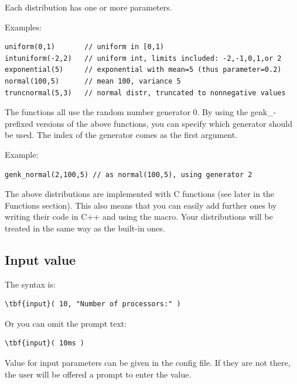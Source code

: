 Each distribution has one or more parameters.

Examples:

\begin{Verbatim}
uniform(0,1)       // uniform in [0,1)
intuniform(-2,2)   // uniform int, limits included: -2,-1,0,1,or 2
exponential(5)     // exponential with mean=5 (thus parameter=0.2)
normal(100,5)      // mean 100, variance 5
truncnormal(5,3)   // normal distr, truncated to nonnegative values
\end{Verbatim}

The functions all use the random number generator 0. By using the
genk\_-prefixed versions of the
above functions, you can specify which generator should be used. The
index of the generator comes as the first argument.


Example:

\begin{Verbatim}
genk_normal(2,100,5) // as normal(100,5), using generator 2
\end{Verbatim}


The above distributions are implemented with C functions (see later in
the Functions section). This also means that you can easily add
further ones by writing their code in C++ and using the
 macro. Your distributions will be treated
in the same way as the built-in ones.





\subsection{Input value}

The syntax is:


\begin{Verbatim}[commandchars=\\\{\}]
    \tbf{input}( 10, "Number of processors:" )
\end{Verbatim}


Or you can omit the prompt text:

\begin{Verbatim}[commandchars=\\\{\}]
    \tbf{input}( 10ms )
\end{Verbatim}


Value for input parameters can be given in the
config file. If they are not there, the user will be offered a prompt
to enter the value.





